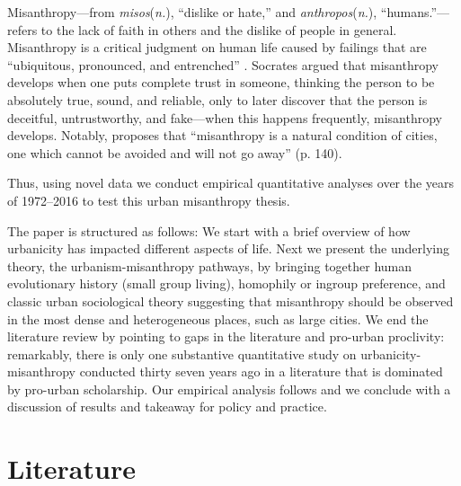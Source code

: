 \documentclass[11pt, letterpaper]{article}
\newcommand{\hilite}[1]{\textcolor{black}{#1}}
\begin{document}
\begin{spacing}{1.4}
Misanthropy---from \textit{misos}(\textit{n.}), ``dislike or hate,'' and \textit{anthropos}(\textit{n.}), ``humans.''---refers to the lack of faith in others and the dislike of people in general.   
%
Misanthropy is a critical judgment on human life caused by failings that are ``ubiquitous, pronounced, and entrenched'' \citep[p. 7]{cooper2018animals}.
Socrates \citep[cited in][]{melgar13} argued
that misanthropy develops when one puts complete trust in someone, thinking the
person to be absolutely true, sound, and reliable, only to later discover that
the person is deceitful, untrustworthy, and fake---when this happens frequently,
misanthropy develops.
 Notably, \citet[]{thrift05} proposes that ``misanthropy is a natural
condition of cities, one which cannot be avoided and will not go away''
(p. 140). %
 
Thus, using novel data we conduct empirical quantitative analyses over the years of 1972--2016 to test this urban misanthropy thesis.
 
The paper is structured as follows: We start with a brief overview of how urbanicity has impacted different aspects of life. Next we present the underlying theory, the urbanism-misanthropy pathways, by bringing together human evolutionary history (small group living), homophily or ingroup preference, and classic urban sociological theory suggesting that
misanthropy should be observed in the most dense and heterogeneous places, such as large cities. We end the literature review by pointing to gaps in the literature and pro-urban proclivity: remarkably, there is only one substantive quantitative study on urbanicity-misanthropy conducted thirty seven years ago in a literature that is dominated by pro-urban scholarship. %
 Our
empirical analysis follows and we conclude with a discussion of results and %
 takeaway for policy and practice.
   

\section*{Literature}


\end{spacing}
\end{document}
